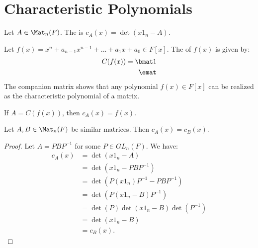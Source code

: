 \section{Characteristic Polynomials}
    \begin{definition}
        Let $A \in \Mat_n(F)$. The  is $c_A(x) = \det(x 1_n - A)$.
    \end{definition}

    \begin{definition}
        Let $f(x) = x^n + a_{n-1}x^{n-1} + ... + a_1 x + a_0 \in F[x]$. The  of $f(x)$ is given by:
            \begin{equation*}
            \begin{split}
                C(f(x)) = 
                \bmat
                1 \\
                \emat
            \end{split}
            \end{equation*}
        The companion matrix shows that any polynomial $f(x) \in F[x]$ can be realized as the characteristic polynomial of a matrix.
    \end{definition}

    \begin{lemma}
        If $A = C(f(x))$, then $c_A(x) = f(x)$.
    \end{lemma}

    \begin{lemma}
        Let $A,B \in \Mat_n(F)$ be similar matrices. Then $c_A(x) = c_B(x)$.
    \end{lemma}
        \begin{proof}
            Let $A = PBP^{-1}$ for some $P \in GL_n(F)$. We have:
                \begin{equation*}
                \begin{split}
                    c_A(x)
                    & = \det(x1_n - A) \\
                    & = \det(x1_n - PBP^{-1}) \\
                    & = \det(P(x1_n)P^{-1} - PBP^{-1}) \\
                    & = \det(P(x1_n - B)P^{-1}) \\
                    & = \det(P)\det(x1_n - B)\det(P^{-1}) \\
                    & = \det(x1_n - B) \\
                    & = c_B(x).
                \end{split}
                \end{equation*}
        \end{proof}

